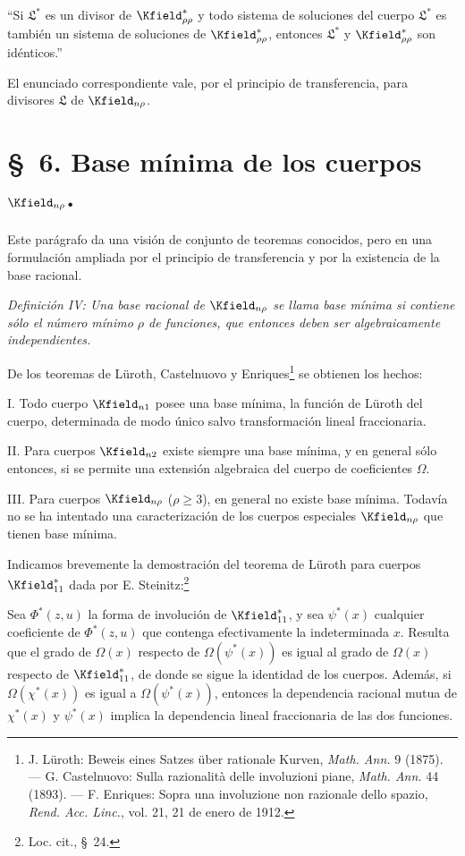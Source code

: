 \documentclass[11pt]{article}
\begin{document}
``Si $\mathfrak{L}^*$ es un divisor de $\Kfield^*_{\rho\rho}$ y todo sistema de soluciones del cuerpo $\mathfrak{L}^*$ es también un sistema de soluciones de $\Kfield^*_{\rho\rho}$, entonces $\mathfrak{L}^*$ y $\Kfield^*_{\rho\rho}$ son idénticos.''

El enunciado correspondiente vale, por el principio de transferencia, para divisores $\mathfrak{L}$ de $\Kfield_{n\rho}$.

\section*{\S\ 6. Base mínima de los cuerpos $\Kfield_{n\rho}$.}

Este parágrafo da una visión de conjunto de teoremas conocidos, pero en una formulación ampliada por el principio de transferencia y por la existencia de la base racional.

\emph{Definición IV: Una base racional de $\Kfield_{n\rho}$ se llama base mínima si contiene sólo el número mínimo $\rho$ de funciones, que entonces deben ser algebraicamente independientes.}

De los teoremas de Lüroth, Castelnuovo y Enriques\footnote{J. Lüroth: Beweis eines Satzes über rationale Kurven, \emph{Math. Ann.} 9 (1875). --- G. Castelnuovo: Sulla razionalità delle involuzioni piane, \emph{Math. Ann.} 44 (1893). --- F. Enriques: Sopra una involuzione non razionale dello spazio, \emph{Rend. Acc. Linc.}, vol. 21, 21 de enero de 1912.} se obtienen los hechos:

I. Todo cuerpo $\Kfield_{n1}$ posee una base mínima, la función de Lüroth del cuerpo, determinada de modo único salvo transformación lineal fraccionaria.

II. Para cuerpos $\Kfield_{n2}$ existe siempre una base mínima, y en general sólo entonces, si se permite una extensión algebraica del cuerpo de coeficientes $\Omega$.

III. Para cuerpos $\Kfield_{n\rho}$ ($\rho\ge3$), en general no existe base mínima. Todavía no se ha intentado una caracterización de los cuerpos especiales $\Kfield_{n\rho}$ que tienen base mínima.

Indicamos brevemente la demostración del teorema de Lüroth para cuerpos $\Kfield^*_{11}$ dada por E. Steinitz:\footnote{Loc. cit., \S\ 24.}

Sea $\Phi^*(z,u)$ la forma de involución de $\Kfield^*_{11}$, y sea $\psi^*(x)$ cualquier coeficiente de $\Phi^*(z,u)$ que contenga efectivamente la indeterminada $x$. Resulta que el grado de $\Omega(x)$ respecto de $\Omega(\psi^*(x))$ es igual al grado de $\Omega(x)$ respecto de $\Kfield^*_{11}$, de donde se sigue la identidad de los cuerpos. Además, si $\Omega(\chi^*(x))$ es igual a $\Omega(\psi^*(x))$, entonces la dependencia racional mutua de $\chi^*(x)$ y $\psi^*(x)$ implica la dependencia lineal fraccionaria de las dos funciones.
\end{document}

